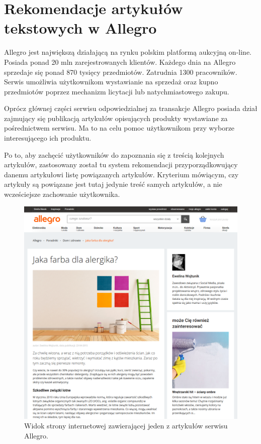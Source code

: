 \documentclass[pl]{minipw} %
\begin{document}
\section{Rekomendacje artykułów tekstowych w Allegro}%
Allegro jest największą\cite{all_naj} działającą na rynku polskim platformą aukcyjną on-line. Posiada ponad 20 mln zarejestrowanych klientów. Każdego dnia na Allegro sprzedaje się ponad 870 tysięcy przedmiotów. Zatrudnia 1300 pracowników.\cite{allegro} Serwis umożliwia użytkownikom wystawianie na sprzedaż oraz kupno przedmiotów poprzez mechanizm licytacji lub natychmiastowego zakupu.

Oprócz głównej części serwisu odpowiedzialnej za transakcje Allegro posiada dział zajmujący się publikacją artykułów opisujących produkty wystawiane za pośrednictwem serwisu. Ma to na celu pomoc użytkownikom przy wyborze interesującego ich produktu.

Po to, aby zachęcić użytkowników do zapoznania się z treścią kolejnych artykułów, zastosowany został tu system rekomendacji przyporządkowujący danemu artykułowi listę powiązanych artykułów. Kryterium mówiącym, czy artykuły są powiązane jest tutaj jedynie treść samych artykułów, a nie wcześciejsze zachowanie użytkownika.

\begin{figure}[H]
	\centering
	\includegraphics[width=1\textwidth]{img/screen_allegro.png}
	\caption{Widok strony internetowej zawierającej jeden z artykułów serwisu Allegro. \cite{screen_allegro}}
\end{figure}
\end{document}
